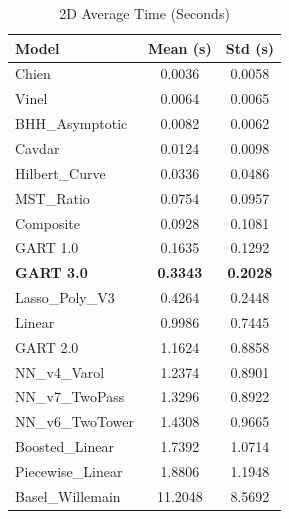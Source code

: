 \documentclass[11pt, a4paper]{article}
\begin{document}
\begin{table}[H]
    \centering
    \caption{2D Average Time (Seconds)}
    \label{tab:2d_avg_time}
    \begin{tabular}{lS[table-format=2.4]S[table-format=2.4]}
        \toprule
        \textbf{Model} & {\textbf{Mean (s)}} & {\textbf{Std (s)}} \\
        \midrule
        Chien & 0.0036 & 0.0058 \\
        Vinel & 0.0064 & 0.0065 \\
        BHH\_Asymptotic & 0.0082 & 0.0062 \\
        Cavdar & 0.0124 & 0.0098 \\
        Hilbert\_Curve & 0.0336 & 0.0486 \\
        MST\_Ratio & 0.0754 & 0.0957 \\
        Composite & 0.0928 & 0.1081 \\
        GART 1.0 & 0.1635 & 0.1292 \\
        \textbf{GART 3.0} & \textbf{0.3343} & \textbf{0.2028} \\
        Lasso\_Poly\_V3 & 0.4264 & 0.2448 \\
        Linear & 0.9986 & 0.7445 \\
        GART 2.0 & 1.1624 & 0.8858 \\
        NN\_v4\_Varol & 1.2374 & 0.8901 \\
        NN\_v7\_TwoPass & 1.3296 & 0.8922 \\
        NN\_v6\_TwoTower & 1.4308 & 0.9665 \\
        Boosted\_Linear & 1.7392 & 1.0714 \\
        Piecewise\_Linear & 1.8806 & 1.1948 \\
        Basel\_Willemain & 11.2048 & 8.5692 \\
        \bottomrule
    \end{tabular}
\end{table}
\end{document}
